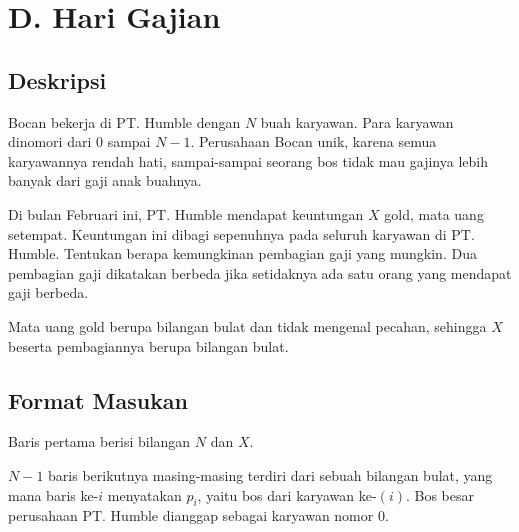 \documentclass{article}
\begin{document}
\pagestyle{fancy}
\fancyhf{}
\renewcommand{\headrulewidth}{0pt}

\section*{\hfil D. Hari Gajian\hfil}


\subsection*{Deskripsi}

\par\noindent Bocan bekerja di PT. Humble dengan $N$ buah karyawan. Para karyawan dinomori dari $0$ sampai $N-1$. Perusahaan Bocan unik, karena semua karyawannya rendah hati, sampai-sampai seorang bos tidak mau gajinya lebih banyak dari gaji anak buahnya.

\par\noindent Di bulan Februari ini, PT. Humble mendapat keuntungan $X$ gold, mata uang setempat. Keuntungan ini dibagi sepenuhnya pada seluruh karyawan di PT. Humble. Tentukan berapa kemungkinan pembagian gaji yang mungkin. Dua pembagian gaji dikatakan berbeda jika setidaknya ada satu orang yang mendapat gaji berbeda.

\par\noindent Mata uang gold berupa bilangan bulat dan tidak mengenal pecahan, sehingga $X$ beserta pembagiannya berupa bilangan bulat.

\subsection*{Format Masukan}

\par\noindent Baris pertama berisi bilangan $N$ dan $X$.
\par\noindent $N-1$ baris berikutnya masing-masing terdiri dari sebuah bilangan bulat, yang mana baris ke-$i$ menyatakan $p_{i}$, yaitu bos dari karyawan ke-$(i)$. Bos besar perusahaan PT. Humble dianggap sebagai karyawan nomor $0$.
\end{document}
